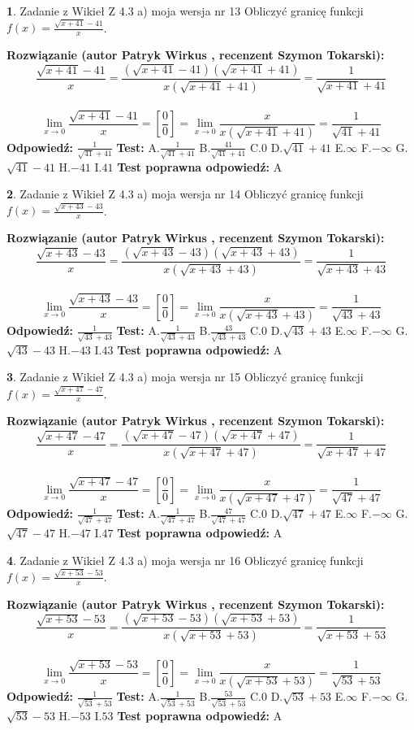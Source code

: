 \documentclass[12pt, a4paper]{article}
\theoremstyle{definition} %
\newtheorem{zad}{}
\newcommand{\zadStart}[1]{\begin{zad}#1\newline}
\newcommand{\zadStop}{\end{zad}}
\newcommand{\rozwStart}[2]{\noindent \textbf{Rozwiązanie (autor #1 , recenzent #2): }\newline}
\newcommand{\rozwStop}{\newline}
\newcommand{\odpStart}{\noindent \textbf{Odpowiedź:}\newline}
\newcommand{\odpStop}{\newline}
\newcommand{\testStart}{\noindent \textbf{Test:}\newline}
\newcommand{\testStop}{\newline}
\newcommand{\kluczStart}{\noindent \textbf{Test poprawna odpowiedź:}\newline}
\newcommand{\kluczStop}{\newline}
\begin{document}
\zadStart{Zadanie z Wikieł Z 4.3 a) moja wersja nr 13}
Obliczyć granicę funkcji $f(x)=\frac{\sqrt{x+41}-41}{x}$.
\zadStop
\rozwStart{Patryk Wirkus}{Szymon Tokarski}
$$\frac{\sqrt{x+41}-41}{x}=\frac{(\sqrt{x+41}-41)(\sqrt{x+41}+41)}{x(\sqrt{x+41}+41)}=\frac{1}{\sqrt{x+41}+41}$$
\\
$$\lim\limits_{x\to0}\frac{\sqrt{x+41}-41}{x}=[\frac{0}{0}]=
\lim\limits_{x\to0}\frac{x}{x(\sqrt{x+41}+41)} = \frac{1}{\sqrt{41}+41}$$
\rozwStop
\odpStart
$\frac{1}{\sqrt{41}+41}$
\odpStop
\testStart
A.$\frac{1}{\sqrt{41}+41}$
B.$\frac{41}{\sqrt{41}+41}$
C.$0$
D.$\sqrt{41}+41$
E.$\infty$
F.$-\infty$
G.$\sqrt{41}-41$
H.$-41$
I.$41$
\testStop
\kluczStart
A
\kluczStop



\zadStart{Zadanie z Wikieł Z 4.3 a) moja wersja nr 14}
Obliczyć granicę funkcji $f(x)=\frac{\sqrt{x+43}-43}{x}$.
\zadStop
\rozwStart{Patryk Wirkus}{Szymon Tokarski}
$$\frac{\sqrt{x+43}-43}{x}=\frac{(\sqrt{x+43}-43)(\sqrt{x+43}+43)}{x(\sqrt{x+43}+43)}=\frac{1}{\sqrt{x+43}+43}$$
\\
$$\lim\limits_{x\to0}\frac{\sqrt{x+43}-43}{x}=[\frac{0}{0}]=
\lim\limits_{x\to0}\frac{x}{x(\sqrt{x+43}+43)} = \frac{1}{\sqrt{43}+43}$$
\rozwStop
\odpStart
$\frac{1}{\sqrt{43}+43}$
\odpStop
\testStart
A.$\frac{1}{\sqrt{43}+43}$
B.$\frac{43}{\sqrt{43}+43}$
C.$0$
D.$\sqrt{43}+43$
E.$\infty$
F.$-\infty$
G.$\sqrt{43}-43$
H.$-43$
I.$43$
\testStop
\kluczStart
A
\kluczStop



\zadStart{Zadanie z Wikieł Z 4.3 a) moja wersja nr 15}
Obliczyć granicę funkcji $f(x)=\frac{\sqrt{x+47}-47}{x}$.
\zadStop
\rozwStart{Patryk Wirkus}{Szymon Tokarski}
$$\frac{\sqrt{x+47}-47}{x}=\frac{(\sqrt{x+47}-47)(\sqrt{x+47}+47)}{x(\sqrt{x+47}+47)}=\frac{1}{\sqrt{x+47}+47}$$
\\
$$\lim\limits_{x\to0}\frac{\sqrt{x+47}-47}{x}=[\frac{0}{0}]=
\lim\limits_{x\to0}\frac{x}{x(\sqrt{x+47}+47)} = \frac{1}{\sqrt{47}+47}$$
\rozwStop
\odpStart
$\frac{1}{\sqrt{47}+47}$
\odpStop
\testStart
A.$\frac{1}{\sqrt{47}+47}$
B.$\frac{47}{\sqrt{47}+47}$
C.$0$
D.$\sqrt{47}+47$
E.$\infty$
F.$-\infty$
G.$\sqrt{47}-47$
H.$-47$
I.$47$
\testStop
\kluczStart
A
\kluczStop



\zadStart{Zadanie z Wikieł Z 4.3 a) moja wersja nr 16}
Obliczyć granicę funkcji $f(x)=\frac{\sqrt{x+53}-53}{x}$.
\zadStop
\rozwStart{Patryk Wirkus}{Szymon Tokarski}
$$\frac{\sqrt{x+53}-53}{x}=\frac{(\sqrt{x+53}-53)(\sqrt{x+53}+53)}{x(\sqrt{x+53}+53)}=\frac{1}{\sqrt{x+53}+53}$$
\\
$$\lim\limits_{x\to0}\frac{\sqrt{x+53}-53}{x}=[\frac{0}{0}]=
\lim\limits_{x\to0}\frac{x}{x(\sqrt{x+53}+53)} = \frac{1}{\sqrt{53}+53}$$
\rozwStop
\odpStart
$\frac{1}{\sqrt{53}+53}$
\odpStop
\testStart
A.$\frac{1}{\sqrt{53}+53}$
B.$\frac{53}{\sqrt{53}+53}$
C.$0$
D.$\sqrt{53}+53$
E.$\infty$
F.$-\infty$
G.$\sqrt{53}-53$
H.$-53$
I.$53$
\testStop
\kluczStart
A
\kluczStop
\end{document}
